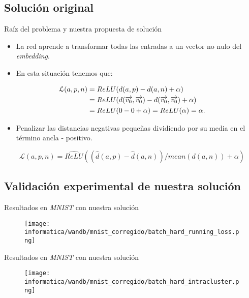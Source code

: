 \subsection{Solución original}
\begin{frame}{Raíz del problema y nuestra propuesta de solución}
	\begin{itemize}
		\item La red aprende a transformar todas las entradas a un vector no nulo del \textit{embedding}.
		\item En esta situación tenemos que:
	\end{itemize}

	\begin{equation} \label{eq:justificacion_relu}
		\begin{split}
			\mathcal{L}(a, p, n) &= ReLU(d(a, p) - d(a, n) + \alpha) \\
			&= ReLU(d(\overrightarrow{v_0}, \overrightarrow{v_0}) - d(\overrightarrow{v_0}, \overrightarrow{v_0}) + \alpha) \\
			&= ReLU(0 - 0 + \alpha) = ReLU(\alpha) = \alpha.
		\end{split}
	\end{equation}

	\begin{itemize}
		\item Penalizar las distancias negativas pequeñas dividiendo por su media en el término ancla - positivo.
	\end{itemize}
	\begin{equation}
		\mathcal{L}(a, p, n) = \widehat{ReLU}((\widehat{d}(a, p) - \widehat{d}(a, n)) / mean(d(a, n)) + \alpha)
	\end{equation}

\end{frame}

\subsection{Validación experimental de nuestra solución}
\begin{frame}{Resultados en \textit{MNIST} con nuestra solución}

	\begin{figure}
		\texttt{[image: informatica/wandb/mnist\_corregido/batch\_hard\_running\_loss.png]}
	\end{figure}
\end{frame}

\begin{frame}{Resultados en \textit{MNIST} con nuestra solución}

	\begin{figure}
		\texttt{[image: informatica/wandb/mnist\_corregido/batch\_hard\_intracluster.png]}
	\end{figure}

\end{frame}

